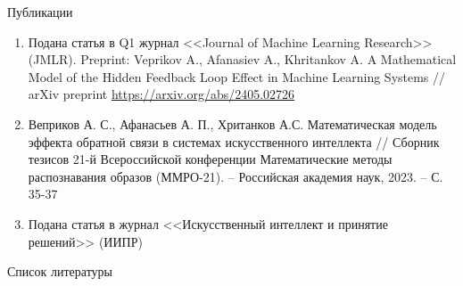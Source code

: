 \documentclass{beamer}
\begin{document}
\begin{frame}{Публикации}
    \begin{enumerate}
        \item Подана статья в Q1 журнал <<Journal of Machine Learning Research>> (JMLR). Preprint: Veprikov A.,   Afanasiev A., Khritankov A. A Mathematical Model of the Hidden Feedback Loop Effect in Machine Learning Systems // arXiv preprint \url{https://arxiv.org/abs/2405.02726}

        \item Веприков А. С., Афанасьев А. П., Хританков А.С. Математическая модель эффекта обратной связи в системах искусственного интеллекта // Сборник тезисов 21-й Всероссийской конференции Математические методы распознавания образов (ММРО-21). – Российская академия наук, 2023. – С. 35-37 

        \item Подана статья в журнал <<Искусственный интеллект и принятие решений>> (ИИПР)
    \end{enumerate}
\end{frame}
\begin{frame}{Список литературы}
    \footnotesize
    
    
\end{frame}
\end{document}
